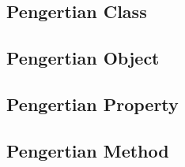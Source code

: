 \subsection{Pengertian Class}
\subsection{Pengertian Object}
\subsection{Pengertian Property}
\subsection{Pengertian Method}